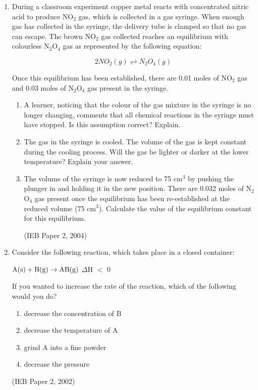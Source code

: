{\begin{enumerate}
\item{During a classroom experiment copper metal reacts with concentrated nitric acid to produce NO$_{2}$ gas, which is collected in a gas syringe. When enough gas has collected in the syringe, the delivery tube is clamped so that no gas can escape. The brown NO$_{2}$ gas collected reaches an equilibrium with colourless N$_{2}$O$_{4}$ gas as represented by the following equation:

\begin{equation*}
2NO_{2} (g) \rightleftharpoons N_{2}O_{4} (g)
\end{equation*}

Once this equilibrium has been established, there are 0.01 moles of NO$_{2}$ gas and 0.03 moles of N$_{2}$O$_{4}$ gas present in the syringe.

	\begin{enumerate}
	\item{A learner, noticing that the colour of the gas mixture in the syringe is no longer changing, comments that all chemical reactions in the syringe must have stopped. Is this assumption correct? Explain.}
	\item{The gas in the syringe is cooled. The volume of the gas is kept constant during the cooling process. Will the gas be lighter or darker at the lower temperature? Explain your answer.}
	\item{The volume of the syringe is now reduced to 75 cm$^{3}$ by pushing the plunger in and holding it in the new position. There are 0.032 moles of N$_{2}$O$_{4}$ gas present once the equilibrium has been re-established at the reduced volume (75 cm$^{3}$). Calculate the value of the equilibrium constant for this equilibrium.}

(IEB Paper 2, 2004)
	\end{enumerate}
}

\item{Consider the following reaction, which takes place in a closed container:

\begin{center}
$\rm{A (s) + B (g) \rightarrow AB (g)}$ $\Delta$H $<$ 0
\end{center}

If you wanted to increase the rate of the reaction, which of the following would you do?
	\begin{enumerate}
	\item{decrease the concentration of B}
	\item{decrease the temperature of A}
	\item{grind A into a fine powder}
	\item{decrease the pressure}
	\end{enumerate}
(IEB Paper 2, 2002)
}


\end{enumerate}}
